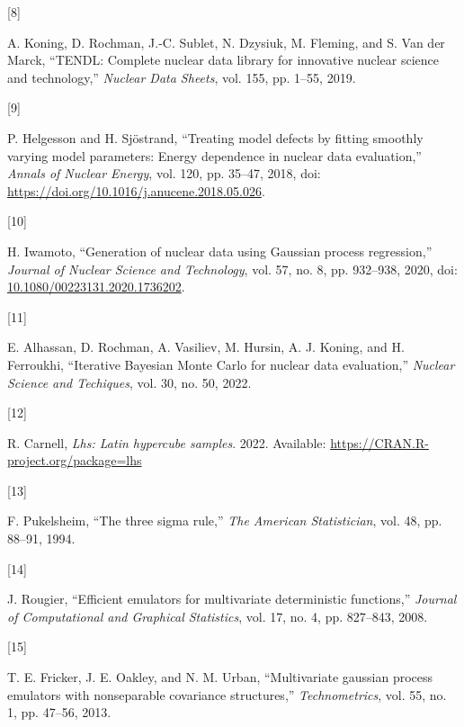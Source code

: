 \documentclass[
  12pt,
  a4paper,
  twoside]{book}
\newlength{\cslhangindent}
\newlength{\csllabelwidth}
\newlength{\cslentryspacingunit} %
\newenvironment{CSLReferences}[2] %
 {%
  \setlength{\parindent}{0pt}
  \ifodd #1
  \let\oldpar\par
  \def\par{\hangindent=\cslhangindent\oldpar}
  \fi
  \setlength{\parskip}{#2\cslentryspacingunit}
 }%
 {}
\newcommand{\CSLLeftMargin}[1]{\parbox[t]{\csllabelwidth}{#1}}
\newcommand{\CSLRightInline}[1]{\parbox[t]{\linewidth - \csllabelwidth}{#1}\break}
\begin{document}
\begin{CSLReferences}{0}{0}
\leavevmode{}%
\CSLLeftMargin{{[}8{]} }
\CSLRightInline{A. Koning, D. Rochman, J.-C. Sublet, N. Dzysiuk, M. Fleming, and S. Van der Marck, {``TENDL: Complete nuclear data library for innovative nuclear science and technology,''} \emph{Nuclear Data Sheets}, vol. 155, pp. 1--55, 2019.}

\leavevmode{}%
\CSLLeftMargin{{[}9{]} }
\CSLRightInline{P. Helgesson and H. Sjöstrand, {``Treating model defects by fitting smoothly varying model parameters: Energy dependence in nuclear data evaluation,''} \emph{Annals of Nuclear Energy}, vol. 120, pp. 35--47, 2018, doi: \url{https://doi.org/10.1016/j.anucene.2018.05.026}.}

\leavevmode{}%
\CSLLeftMargin{{[}10{]} }
\CSLRightInline{H. Iwamoto, {``{Generation of nuclear data using Gaussian process regression},''} \emph{Journal of Nuclear Science and Technology}, vol. 57, no. 8, pp. 932--938, 2020, doi: \href{https://doi.org/10.1080/00223131.2020.1736202}{10.1080/00223131.2020.1736202}.}

\leavevmode{}%
\CSLLeftMargin{{[}11{]} }
\CSLRightInline{E. Alhassan, D. Rochman, A. Vasiliev, M. Hursin, A. J. Koning, and H. Ferroukhi, {``{Iterative Bayesian Monte Carlo for nuclear data evaluation},''} \emph{Nuclear Science and Techiques}, vol. 30, no. 50, 2022.}

\leavevmode{}%
\CSLLeftMargin{{[}12{]} }
\CSLRightInline{R. Carnell, \emph{Lhs: Latin hypercube samples}. 2022. Available: \url{https://CRAN.R-project.org/package=lhs}}

\leavevmode{}%
\CSLLeftMargin{{[}13{]} }
\CSLRightInline{F. Pukelsheim, {``The three sigma rule,''} \emph{The American Statistician}, vol. 48, pp. 88--91, 1994.}

\leavevmode{}%
\CSLLeftMargin{{[}14{]} }
\CSLRightInline{J. Rougier, {``Efficient emulators for multivariate deterministic functions,''} \emph{Journal of Computational and Graphical Statistics}, vol. 17, no. 4, pp. 827--843, 2008.}

\leavevmode{}%
\CSLLeftMargin{{[}15{]} }
\CSLRightInline{T. E. Fricker, J. E. Oakley, and N. M. Urban, {``Multivariate gaussian process emulators with nonseparable covariance structures,''} \emph{Technometrics}, vol. 55, no. 1, pp. 47--56, 2013.}


\end{CSLReferences}
\end{document}
